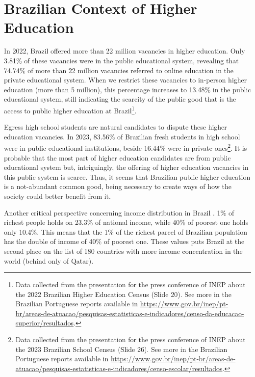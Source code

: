 \section{Brazilian Context of Higher Education}
\label{equity-sec:br-context}

In 2022, Brazil offered more than 22 million vacancies in higher education. Only 3.81\% of these vacancies were in the public educational system, revealing that 74.74\% of more than 22 million vacancies referred to online education in the private educational system. When we restrict these vacancies to in-person higher education (more than 5 million), this percentage increases to 13.48\% in the public educational system, still indicating the scarcity of the public good that is the access to public higher education at Brazil\footnote{Data collected from the presentation for the press conference of \gls{INEP} about the 2022 Brazilian Higher Education Census (Slide 20). See more in the Brazilian Portuguese reports available in \url{https://www.gov.br/inep/pt-br/areas-de-atuacao/pesquisas-estatisticas-e-indicadores/censo-da-educacao-superior/resultados}.}.

Egress high school students are natural candidates to dispute these higher education vacancies. In 2023, 83.56\% of Brazilian fresh students in high school were in public educational institutions, beside 16.44\% were in private ones\footnote{Data collected from the presentation for the press conference of \gls{INEP} about the 2023 Brazilian School Census (Slide 26). See more in the Brazilian Portuguese reports available in \url{https://www.gov.br/inep/pt-br/areas-de-atuacao/pesquisas-estatisticas-e-indicadores/censo-escolar/resultados}.}. It is probable that the most part of higher education candidates are from public educational system but, intriguingly, the offering of higher education vacancies in this public system is scarce. Thus, it seems that Brazilian public higher education is a not-abundant common good, being necessary to create ways of how the society could better benefit from it.

Another critical perspective concerning income distribution in Brazil \cite{sasse:2021}. 1\% of richest people holds on 23.3\% of national income, while 40\% of poorest one holds only 10.4\%. This means that the 1\% of  the richest parcel of Brazilian population has the double of income of 40\% of poorest one. These values puts Brazil at the second place on the list of 180 countries with more income concentration in the world (behind only of Qatar).

